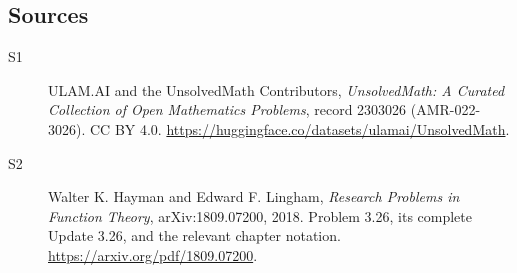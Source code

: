 \documentclass[11pt]{book}
\begin{document}
\subsection{Sources}
\begin{description}
\item[\hypertarget{source:2303026:1}{S1}] ULAM.AI and the UnsolvedMath Contributors, \emph{UnsolvedMath: A Curated Collection of Open Mathematics Problems}, record 2303026 (AMR-022-3026). CC BY 4.0. \url{https://huggingface.co/datasets/ulamai/UnsolvedMath}.
\item[\hypertarget{source:2303026:2}{S2}] Walter K. Hayman and Edward F. Lingham, \emph{Research Problems in Function Theory}, arXiv:1809.07200, 2018. Problem 3.26, its complete Update 3.26, and the relevant chapter notation. \url{https://arxiv.org/pdf/1809.07200}.
\end{description}
\label{end:2303026}
\end{document}

